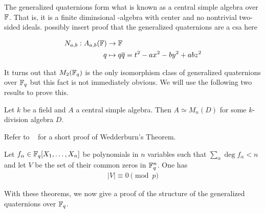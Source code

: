 \documentclass{amsart}
\begin{document}
The generalized quaternions form what is known as a central simple algebra over $\protect\mathbb{F}$. That is, it is a finite diminsional \bF-algebra with center \bF and no nontrivial two-sided ideals.
{\color{blue} possibly insert proof that the generalized quaternions are a csa here}

\begin{defn}
\begin{align*}
    N_{a,b}:  A_{a,b}(\protect\mathbb{F}) & \rightarrow \protect\mathbb{F}  \\
    q & \mapsto q \overline{q} = t^2 -ax^2 -by^2 +abz^2 
\end{align*}
\end{defn}

It turns out that $M_2(\protect\mathbb{F}_q)$ is the only isomorphism class of generalized quaternions over $\protect\mathbb{F}_q$ but this fact is not immediately obvious. We will use the following two results to prove this.

\begin{theorem}\label{wedderburn}
    Let $k$ be a field and $A$ a central simple algebra. Then $A \simeq M_n(D)$ for some $k$-division algebra $D$.
\end{theorem}

Refer to ~\cite{Henderson65} for a short proof of Wedderburn's Theorem.

\begin{theorem}\label{c-warning}
    Let $f_{\alpha} \in \protect\mathbb{F}_q[X_1, \dots, X_n]$ be polynomials in $n$ variables such that $\sum_{\alpha} \deg f_{\alpha} < n$ and let $V$ be the set of their common zeros in $\protect\mathbb{F}_q^n$. One has 
    \begin{align*}
        | V | \equiv 0 \pmod{p}
    \end{align*}
\end{theorem}

With these theorems, we now give a proof of the structure of the generalized quaternions over $\protect\mathbb{F}_q$.
\end{document}

